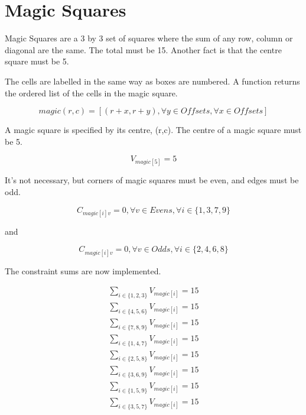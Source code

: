 \documentclass{article}
\begin{document}
\section{Magic Squares}


Magic Squares are a 3 by 3 set of squares where the sum of any row, column or diagonal are the same. The total must be 15. Another
fact is that the centre square must be 5. 

The cells are labelled in the same way as boxes are numbered. A function returns the ordered list of the cells in the magic square.


\begin{equation}
magic(r,c) = [ (r+x, r+y), \forall y \in Offsets, \forall x \in Offsets ]
\end{equation}

A magic square is specified by its centre, (r,c).  The centre of a magic square must be 5. 

\begin{equation}
V_{magic[5]} = 5
\end{equation}

It's not necessary, but corners of magic squares must be even, and edges must be odd. 


\begin{equation}
C_{magic[i] v} = 0, \forall v \in Evens, \forall i \in \lbrace 1,3,7,9 \rbrace
\end{equation}

 and 

\begin{equation}
C_{magic[i] v} = 0, \forall v \in Odds, \forall i \in \lbrace 2,4,6,8 \rbrace
\end{equation}

The constraint sums are now implemented.

\begin{gather}
\sum_{i \in \lbrace 1,2,3 \rbrace} V_{magic[i]} = 15 \\
\sum_{i \in \lbrace 4,5,6 \rbrace} V_{magic[i]} = 15 \\
\sum_{i \in \lbrace 7,8,9 \rbrace} V_{magic[i]} = 15 \\
\sum_{i \in \lbrace 1,4,7 \rbrace} V_{magic[i]} = 15 \\
\sum_{i \in \lbrace 2,5,8 \rbrace} V_{magic[i]} = 15 \\
\sum_{i \in \lbrace 3,6,9 \rbrace} V_{magic[i]} = 15 \\
\sum_{i \in \lbrace 1,5,9 \rbrace} V_{magic[i]} = 15 \\
\sum_{i \in \lbrace 3,5,7 \rbrace} V_{magic[i]} = 15 
\end{gather}
\end{document}
